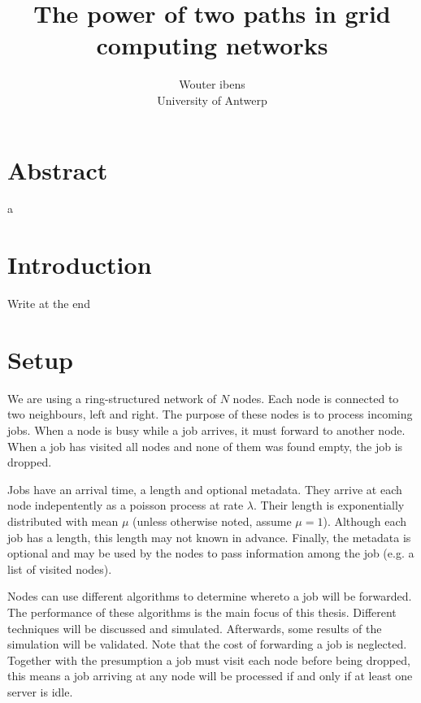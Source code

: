 \documentclass[10pt,a4paper,titlepage]{article}
\author{Wouter ibens \\ University of Antwerp}
\title{The power of two paths in grid computing networks}
\begin{document}
\maketitle

\section*{Abstract}
a

\newpage

\tableofcontents

\newpage

\section*{Introduction}
Write at the end


\section{Setup}
We are using a ring-structured network of $N$ nodes. Each node is connected to two neighbours, left and right. The purpose of these nodes is to process incoming jobs. When a node is busy while a job arrives, it must forward to another node. When a job has visited all nodes and none of them was found empty, the job is dropped.

Jobs have an arrival time, a length and optional metadata. They arrive at each node indepentently as a poisson process at rate $\lambda$. Their length is exponentially distributed with mean $\mu$ (unless otherwise noted, assume $\mu=1$). Although each job has a length, this length may not known in advance. Finally, the metadata is optional and may be used by the nodes to pass information among the job (e.g. a list of visited nodes).

Nodes can use different algorithms to determine whereto a job will be forwarded. The performance of these algorithms is the main focus of this thesis. Different techniques will be discussed and simulated. Afterwards, some results of the simulation will be validated.
Note that the cost of forwarding a job is neglected. Together with the presumption a job must visit each node before being dropped, this means a job arriving at any node will be processed if and only if at least one server is idle.
\end{document}
